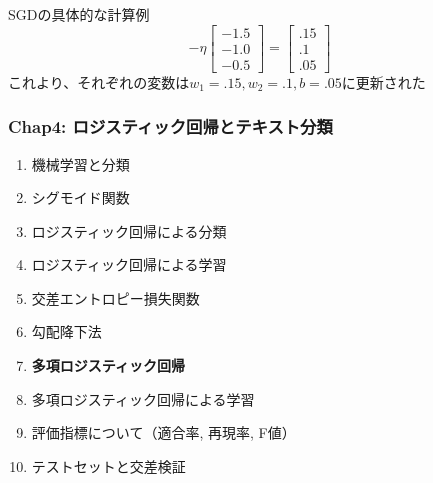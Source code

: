 \documentclass[unicode,11pt]{beamer} %
\begin{document}
\begin{frame}
\begin{exampleblock}{SGDの具体的な計算例}
\begin{equation*}
            - \eta
            \begin{bmatrix}
                -1.5\\
                -1.0\\
                -0.5
            \end{bmatrix}
            =
            \begin{bmatrix}
                .15\\
                .1\\
                .05
            \end{bmatrix}
        \end{equation*}
        これより、それぞれの変数は$w_1 = .15, w_2 = .1, b = .05$に更新された
    \end{exampleblock}
\end{frame}


\begin{frame}
    \frametitle{Chap4: ロジスティック回帰とテキスト分類}
    \begin{block}{}
        \begin{enumerate}
            \item 機械学習と分類
            \item シグモイド関数
            \item ロジスティック回帰による分類
            \item ロジスティック回帰による学習
            \item 交差エントロピー損失関数
            \item 勾配降下法
            \item {\color{red}\textbf{多項ロジスティック回帰}}
            \item 多項ロジスティック回帰による学習
            \item 評価指標について（適合率, 再現率, F値）
            \item テストセットと交差検証
        \end{enumerate}
    \end{block}
\end{frame}
\end{document}
